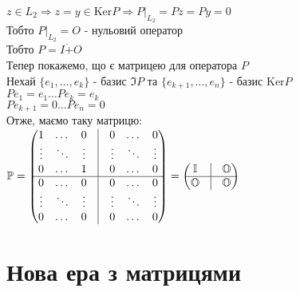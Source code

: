 \documentclass[a4paper, 14pt]{extarticle}
\def\bigline{\vspace{5mm}\\}
\def\ker#1{\textrm{Ker} {#1}}
\begin{document}
$z \in L_2 \Rightarrow z = y \in \ker P \Rightarrow P|_{L_2} = Pz = Py = 0$\\
Тобто $P|_{L_2} = O$ - нульовий оператор\\
Тобто $P = I \dot{+} O$
\bigline
Тепер покажемо, що є матрицею для оператора $P$\\
Нехай $\{e_1,\dots,e_k\}$ - базис $\Im P$ та $\{e_{k+1},\dots,e_n\}$ - базис $\ker P$\\
$Pe_1 = e_1 \dots Pe_k = e_k$\\
$Pe_{k+1} = 0 \dots Pe_n = 0$\\
Отже, маємо таку матрицю:\\
$\mathbb{P} = \begin{pmatrix}
1 & \dots & 0 & \vline & 0 & \dots & 0 \\
\vdots & \ddots & \vdots & \vline & \vdots & \ddots & \vdots \\
0 & \dots & 1 & \vline & 0 & \dots & 0 \\
\hline
0 & \dots & 0 & \vline & 0 & \dots & 0 \\
\vdots & \ddots & \vdots & \vline & \vdots & \ddots & \vdots \\
0 & \dots & 0 & \vline & 0 & \dots & 0 \\
\end{pmatrix} = \begin{pmatrix}
\mathbb{I}  & \vline & \mathbb{O} \\
 \hline
\mathbb{O} & \vline & \mathbb{O}
\end{pmatrix}$

\newpage
\setcounter{section}{3}
\setcounter{subsection}{0}
\section{Нова ера з матрицями}
\end{document}
